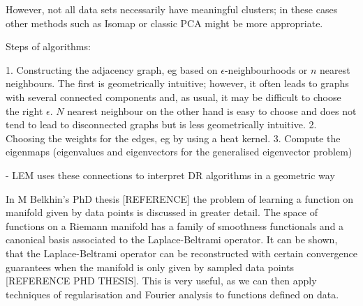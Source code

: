 \documentclass[journal, a4paper]{IEEEtran}
\begin{document}
However, not all data sets necessarily have meaningful clusters; in these cases other methods such as Isomap or classic PCA might be more appropriate. 

Steps of algorithms:

1. Constructing the adjacency graph, eg based on \( \epsilon \)-neighbourhoods or \( n \) nearest neighbours.
The first is geometrically intuitive; however, it often leads to graphs with several connected components and, as usual, it may be difficult to choose the right \( \epsilon \). \( N \) nearest neighbour on the other hand is easy to choose and does not tend to lead to disconnected graphs but is less geometrically intuitive.
2. Choosing the weights for the edges, eg by using a heat kernel.
3. Compute the eigenmaps (eigenvalues and eigenvectors for the generalised eigenvector problem)

- LEM uses these connections to interpret DR algorithms in a geometric way %



In M Belkhin's PhD thesis [REFERENCE] the problem of learning a function on manifold given by data points is discussed in greater detail. The space of functions on a Riemann manifold has a family of smoothness functionals and a canonical basis associated to the Laplace-Beltrami operator. It can be shown, that the Laplace-Beltrami operator can be reconstructed with certain convergence guarantees when the manifold is only given by sampled data points [REFERENCE PHD THESIS]. This is very useful, as we can then apply techniques of regularisation and Fourier analysis to functions defined on data. 
 
 
\end{document}
